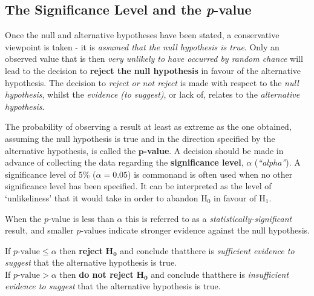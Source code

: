 \documentclass[
  11pt,
]{book}
\begin{document}
\subsection*{\texorpdfstring{The Significance Level and the \textit{p}-value}{The Significance Level and the -value}}\label{the-significance-level-and-the--value}

Once the null and alternative hypotheses have been stated, a conservative viewpoint is taken - it is \emph{assumed that the null hypothesis is true}. Only an observed value that is then \emph{very unlikely to have occurred by random chance} will lead to the decision to \textbf{reject the null hypothesis} in favour of the alternative hypothesis. The decision to \emph{reject or not reject} is made with respect to the \emph{null hypothesis}, whilst the \emph{evidence (to suggest)}, or lack of, relates to the \emph{alternative hypothesis}.

The probability of observing a result at least as extreme as the one obtained, assuming the null hypothesis is true and in the direction specified by the alternative hypothesis, is called the \(\mathbf{p}\)\textbf{-value}. A decision should be made in advance of collecting the data regarding the \textbf{significance level}, \(\alpha\) (\emph{``alpha''}). A significance level of 5\% (\(\alpha=\text{0.05}\)) is commonand is often used when no other significance level has been specified. It can be interpreted as the level of `unlikeliness' that it would take in order to abandon \(\text{H}_\text{0}\) in favour of \(\text{H}_\text{1}\).

When the \(p\)-value is less than \(\alpha\) this is referred to as a \emph{statistically-significant} result, and smaller \(p\)-values indicate stronger evidence against the null hypothesis.

\begin{centering}
\begin{tcolorbox}[adjusted title=The decision rule for the $p$-value and the significance level $\alpha$:, halign title = center,colback=red!5,colframe=red!70!black, halign = center,center]
\centering
If $p\text{-value}\leqslant\alpha$ then \textbf{reject }$\mathbf{\text{H}_\text{0}}$ and conclude that\newline there is \textit{sufficient evidence to suggest} that the  alternative hypothesis is true.\\
\vspace{0.5cm}
If $p\text{-value}>\alpha$ then \textbf{do not reject }$\mathbf{\text{H}_\text{0}}$ and conclude that\newline there is \textit{insufficient evidence to suggest} that the alternative hypothesis is true.
\end{tcolorbox}
\end{centering}
\end{document}
